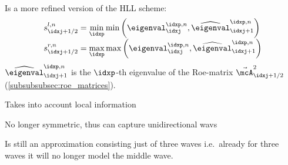 \begin{defnbox}\nospacing
    \begin{defn}\label{defn:einfeldt_scheme}\leavevmode\\
        Is a more refined version of the HLL scheme:
        \begin{align}
          &s_{\idxj+1/2}^{l,n}=\min_{\idxp}\min\left(\eigenval_{\idxj}^{\idxp,n},\widehat{\eigenval}_{\idxj+1}^{\idxp,n}\right)\\[-1\jot]
          &s_{\idxj+1/2}^{r,n}=\max_{\idxp}\max\left(\eigenval_{\idxj}^{\idxp,n},\widehat{\eigenval}_{\idxj+1}^{\idxp,n}\right)
        \end{align}
        $\widehat{\eigenval}_{\idxj+1}^{\idxp,n}$ is the $\idxp$-th eigenvalue of the Roe-matrix $\linfluxvec_{\idxj+1/2}^{2}$ (\cref{subsubsubsec:roe_matrices}).
    \end{defn}
\end{defnbox}
\begin{sectionbox}\nospacing
    \begin{minipage}[t]{0.4\textwidth}
       \begin{proslist}
           \item Takes into account local information
           \item No longer symmetric, thus can capture unidirectional wavs
       \end{proslist}
    \end{minipage}
    \begin{minipage}[t]{0.55\textwidth}
       \begin{conslist}
           \item Is still an approximation consisting just of three waves i.e.\ already for
           three waves it will no longer model the middle wave.
       \end{conslist}
    \end{minipage}
\end{sectionbox}
